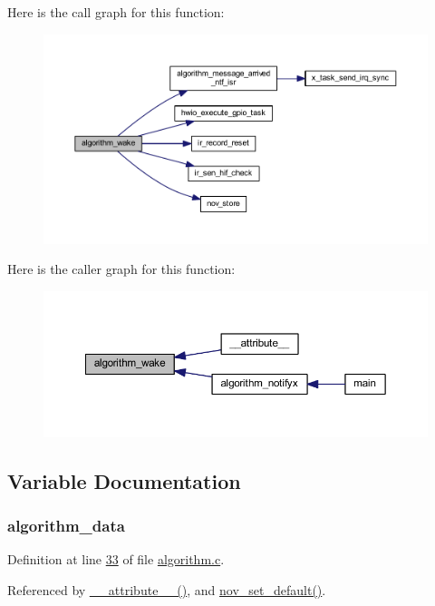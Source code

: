 Here is the call graph for this function\+:\nopagebreak
\begin{figure}[H]
\begin{center}
\leavevmode
\includegraphics[width=350pt]{d7/d7a/a00016_a42ed16c7ef20e0c0031fe7ba7ae377b3_cgraph}
\end{center}
\end{figure}




Here is the caller graph for this function\+:\nopagebreak
\begin{figure}[H]
\begin{center}
\leavevmode
\includegraphics[width=350pt]{d7/d7a/a00016_a42ed16c7ef20e0c0031fe7ba7ae377b3_icgraph}
\end{center}
\end{figure}




\subsection{Variable Documentation}
\hypertarget{a00016_a183caa40cd01e79ee309cc9c4a225197}{
\subsubsection[{algorithm\+\_\+data}]{ algorithm\+\_\+data}}\label{a00016_a183caa40cd01e79ee309cc9c4a225197}


Definition at line \hyperlink{a00038_source_l00033}{33} of file \hyperlink{a00038_source}{algorithm.\+c}.



Referenced by \hyperlink{a00041_source_l00025}{\+\_\+\+\_\+attribute\+\_\+\+\_\+()}, and \hyperlink{a00060_source_l00760}{nov\+\_\+set\+\_\+default()}.

